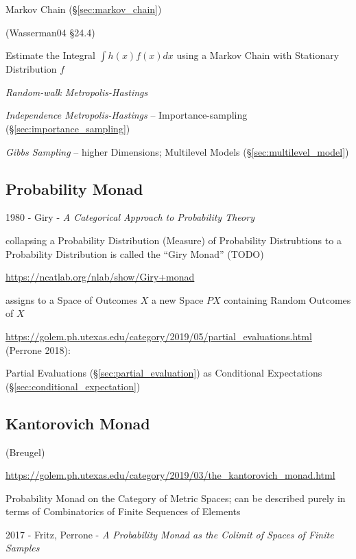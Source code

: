 Markov Chain (\S\ref{sec:markov_chain})

(Wasserman04 \S24.4)

Estimate the Integral $\int h(x) f(x) dx$ using a Markov Chain with Stationary
Distribution $f$

\emph{Random-walk Metropolis-Hastings}

\emph{Independence Metropolis-Hastings} -- Importance-sampling
(\S\ref{sec:importance_sampling})

\emph{Gibbs Sampling} -- higher Dimensions; Multilevel Models
(\S\ref{sec:multilevel_model})



\subsection{Probability Monad}\label{sec:probability_monad}

1980 - Giry - \emph{A Categorical Approach to Probability Theory}

collapsing a Probability Distribution (Measure) of Probability Distrubtions to a
Probability Distribution is called the ``Giry Monad'' (TODO)

\url{https://ncatlab.org/nlab/show/Giry+monad}

assigns to a Space of Outcomes $X$ a new Space $P X$ containing Random Outcomes
of $X$

\url{https://golem.ph.utexas.edu/category/2019/05/partial_evaluations.html}
(Perrone 2018):

Partial Evaluations (\S\ref{sec:partial_evaluation}) as Conditional Expectations
(\S\ref{sec:conditional_expectation})



\subsection{Kantorovich Monad}\label{sec:kantorovich_monad}

(Breugel)

\url{https://golem.ph.utexas.edu/category/2019/03/the_kantorovich_monad.html}

Probability Monad on the Category of Metric Spaces; can be described purely in
terms of Combinatorics of Finite Sequences of Elements

2017 - Fritz, Perrone - \emph{A Probability Monad as the Colimit of Spaces of
  Finite Samples}



